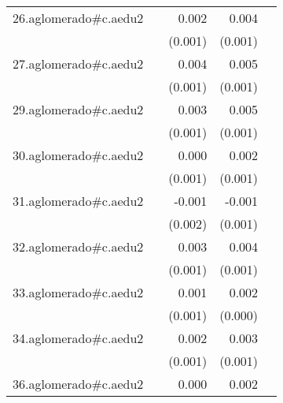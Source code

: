 {\begin{longtable}{l*{4}{D{.}{.}{-1}}}
\addlinespace
26.aglomerado#c.aedu2&                     &       0.002         &       0.004\sym{***}&                     \\
            &                     &     (0.001)         &     (0.001)         &                     \\
\addlinespace
27.aglomerado#c.aedu2&                     &       0.004\sym{**} &       0.005\sym{***}&                     \\
            &                     &     (0.001)         &     (0.001)         &                     \\
\addlinespace
29.aglomerado#c.aedu2&                     &       0.003\sym{**} &       0.005\sym{***}&                     \\
            &                     &     (0.001)         &     (0.001)         &                     \\
\addlinespace
30.aglomerado#c.aedu2&                     &       0.000         &       0.002\sym{*}  &                     \\
            &                     &     (0.001)         &     (0.001)         &                     \\
\addlinespace
31.aglomerado#c.aedu2&                     &      -0.001         &      -0.001         &                     \\
            &                     &     (0.002)         &     (0.001)         &                     \\
\addlinespace
32.aglomerado#c.aedu2&                     &       0.003\sym{*}  &       0.004\sym{***}&                     \\
            &                     &     (0.001)         &     (0.001)         &                     \\
\addlinespace
33.aglomerado#c.aedu2&                     &       0.001         &       0.002\sym{***}&                     \\
            &                     &     (0.001)         &     (0.000)         &                     \\
\addlinespace
34.aglomerado#c.aedu2&                     &       0.002         &       0.003\sym{**} &                     \\
            &                     &     (0.001)         &     (0.001)         &                     \\
\addlinespace
36.aglomerado#c.aedu2&                     &       0.000         &       0.002\sym{*}  &                     \\

\end{longtable}}
